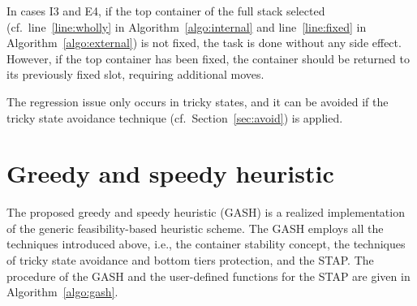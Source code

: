 \documentclass[review,3p,times,12pt,number]{elsarticle}\usepackage{amsmath}\usepackage{amssymb}
\begin{document}
In cases I3 and E4, if the top container of the full stack selected (cf.\ line~\ref{line:wholly} in Algorithm~\ref{algo:internal} and line~\ref{line:fixed} in Algorithm~\ref{algo:external}) is not fixed, the task is done without any side effect. However, if the top container has been fixed, the container should be returned to its previously fixed slot, requiring additional moves.

The regression issue only occurs in tricky states, and it can be avoided if the tricky state avoidance technique (cf.\ Section~\ref{sec:avoid}) is applied.



\section{Greedy and speedy heuristic}

\label{sec:gash}


The proposed {greedy and speedy heuristic} (GASH) is a realized implementation of the generic feasibility-based heuristic scheme.
The GASH employs all the techniques introduced above, i.e., the container stability concept, the techniques of tricky state avoidance and bottom tiers protection, and the STAP\@. The procedure of the GASH and the user-defined functions for the STAP are given in Algorithm~\ref{algo:gash}.
\end{document}
